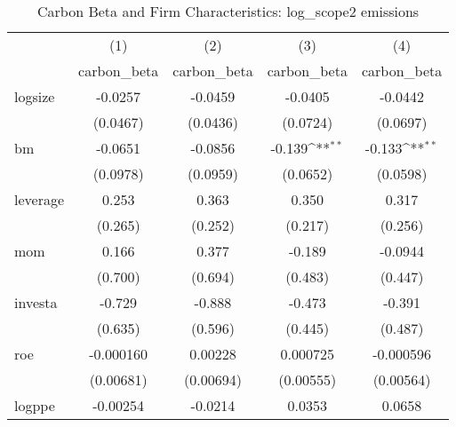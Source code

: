 \begin{table}[htbp]\centering
\def\sym#1{\ifmmode^{#1}\else\(^{#1}\)\fi}
\caption{Carbon Beta and Firm Characteristics: log\_scope2 emissions}
\begin{tabular}{l*{4}{c}}
\hline\hline
                    &\multicolumn{1}{c}{(1)}&\multicolumn{1}{c}{(2)}&\multicolumn{1}{c}{(3)}&\multicolumn{1}{c}{(4)}\\
                    &\multicolumn{1}{c}{carbon\_beta}&\multicolumn{1}{c}{carbon\_beta}&\multicolumn{1}{c}{carbon\_beta}&\multicolumn{1}{c}{carbon\_beta}\\
\hline
logsize             &     -0.0257         &     -0.0459         &     -0.0405         &     -0.0442         \\
                    &    (0.0467)         &    (0.0436)         &    (0.0724)         &    (0.0697)         \\
[1em]
bm                  &     -0.0651         &     -0.0856         &      -0.139\sym{**} &      -0.133\sym{**} \\
                    &    (0.0978)         &    (0.0959)         &    (0.0652)         &    (0.0598)         \\
[1em]
leverage            &       0.253         &       0.363         &       0.350         &       0.317         \\
                    &     (0.265)         &     (0.252)         &     (0.217)         &     (0.256)         \\
[1em]
mom                 &       0.166         &       0.377         &      -0.189         &     -0.0944         \\
                    &     (0.700)         &     (0.694)         &     (0.483)         &     (0.447)         \\
[1em]
investa             &      -0.729         &      -0.888         &      -0.473         &      -0.391         \\
                    &     (0.635)         &     (0.596)         &     (0.445)         &     (0.487)         \\
[1em]
roe                 &   -0.000160         &     0.00228         &    0.000725         &   -0.000596         \\
                    &   (0.00681)         &   (0.00694)         &   (0.00555)         &   (0.00564)         \\
[1em]
logppe              &    -0.00254         &     -0.0214         &      0.0353         &      0.0658         \\

\end{tabular}
\end{table}
